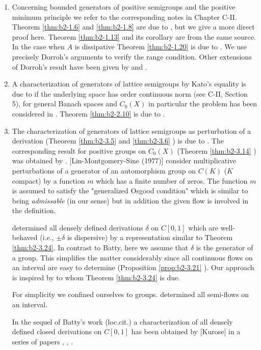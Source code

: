 \begin{enumerate}[label=\emph{Section \arabic*:}, wide]

\item
Concerning bounded generators of positive semigroups and the positive minimum principle we refer to the corresponding notes in Chapter C-II.
Theorem \ref{thm:b2-1.6} and \ref{thm:b2-1.8} are due to \citet{arendtchernoffkato:1982}, but we give a more direct proof here.
Theorem \ref{thm:b2-1.13} and its corollary are from the same source.
In the case when $A$ is dissipative Theorem \ref{thm:b2-1.20} is due to \citet{dorroh:1966}.
We use precisely Dorroh's arguments to verify the range condition.
Other extensions of Dorroh's result have been given by \citet{lumer:1974} and \citet{lumer:1975}.

\item 
A characterization of generators of lattice semigroups by Kato's equality is due to  \citet{nageluhlig:1981} if the underlying space has order continuous norm (see C-II, Section 5), for general Banach spaces and $C_{0}(X)$ in particular the problem has been considered in \citet{arendt:1982}.
Theorem \ref{thm:b2-2.10} is due to \citet{uhlig:1979}.

\item
The characterization of generators of lattice semigroups as perturbation of a derivation (Theorem \ref{thm:b2-3.5} and \ref{thm:b2-3.6} ) is due to \citet{derndingernagel:1979}.
The corresponding result for positive groups on $C_{0}(X)$ (Theorem \ref{thm:b2-3.14} ) was obtained by \citet{arendtgreiner:1984}.
\citet{linetal:1977} [Lin-Montgomery-Sine (1977)] 
consider multiplicative perturbations of a generator of an automorphism group on $C(K)$ ($K$ compact) by a function $m$ which has a finite number of zeros.
The function $m$ is assumed to satisfy the "generalized Osgood condition" which is similar to being \emph{admissable} (in our sense) but in addition the given flow is involved in the definition.

\citet{batty:1981} determined all densely defined derivations $\delta$ on $C[0,1]$ which are well-behaved (i.e., $\pm\delta$ is dispersive) by a representation similar to Theorem \ref{thm:b2-3.24}.
In contrast to Batty, here we assume that $\delta$ is the generator of a group.
This simplifies the matter considerably since all continuous flows on an interval are easy to determine (Proposition \ref{prop:b2-3.21} ).
Our approach is inspired by \citet{delaubenfels:1984} to whom Theorem \ref{thm:b2-3.24} is due.

For simplicity we confined ourselves to groups.
\citet{uhlig:1979} determined all semi-flows on an interval.

In the sequel of Batty's work (loc.cit.) a characterization of all densely defined closed derivations on $C[0,1]$ has been obtained by [Kurose] in a series of papers \citet{kurose:1981}, \citet{kurose:1982}, \citet{kurose:1983}.
\end{enumerate}

{\RaggedRight

}

